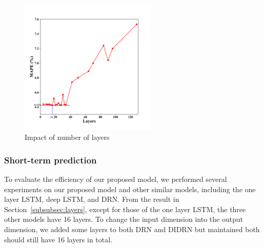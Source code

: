 \documentclass[twocolumn]{article}
\begin{document}
\begin{figure}[h]
    \centering
    \includegraphics[height = 6.5cm]{Figure/layers.pdf}
    \caption{Impact of number of layers}
    \label{fig:layer}
\end{figure}


\subsubsection{Short-term prediction}\label{subsubsec:short}
\par
To evaluate the efficiency of our proposed model, we performed several experiments on our proposed model and other similar models, including the one layer LSTM, deep LSTM, and DRN. From the result in Section~\ref{subsubsec:layers}, except for those of the one layer LSTM, the three other models have 16 layers. To change the input dimension into the output dimension, we added some layers to both DRN and DIDRN but maintained both should still have 16 layers in total.
\end{document}
